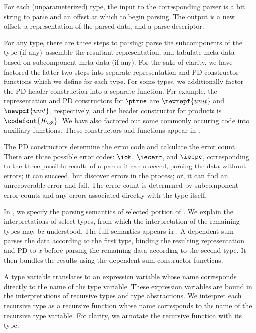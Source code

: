 For each (unparameterized) type, the input to the corresponding parser
is a bit string to parse and an offset at which to begin parsing.  
The output is a new offset,
a representation of the parsed data, and a parse descriptor.

For any type, there are three steps to parsing: parse the
subcomponents of the type (if any), assemble the resultant
representation, and tabulate meta-data based on subcomponent meta-data
(if any). For the sake of clarity, we have factored the latter two
steps into separate representation and PD constructor functions which
we define for each type. For some types, we additionally factor the PD
header construction into a separate function. For example, the
representation and PD constructors for $\ptrue$ are $\newrepf {unit}$
and $\newpdf {unit}$, respectively, and the header constructor for
products is ${\codefont{H_{\gS}}}$.  We have also factored out some commonly
occuring code into auxiliary functions.  These constructors and functions
appear in .

The PD constructors determine the error code and calculate the error
count.  There are three possible error codes: $\iok$, $\iecerr$, and
$\iecpc$, corresponding to the three possible results of a parse: it
can succeed, parsing the data without errors; it can succeed, but
discover errors in the process; or, it can find an unrecoverable error
and fail.  The error count is determined by subcomponent error counts
and any errors associated directly with the type itself.

In , we specify the parsing semantics of
selected portion of \ddc{}. We explain the interpretations of select
types, from which the interpretation of the remaining types may be
understood. The full semantics appears in .
A dependent sum parses the data according to the first type, binding
the resulting representation and PD to $x$ before parsing the
remaining data according to the second type. It then bundles the
results using the dependent sum constructor functions.

A type variable translates to an expression variable whose name
corresponds directly to the name of the type variable. These
expression variables are bound in the interpretations of recursive
types and type abstractions. We interpret each recursive type as a
recursive function whose name corresponds to the name of the recursive
type variable. For clarity, we annotate the recursive function with its
type.


